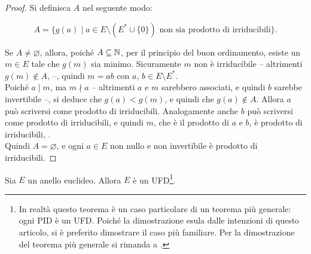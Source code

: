 \documentclass[a4paper]{article}
\let\emptyset\varnothing
\begin{document}
\begin{proof}
    Si definisca $A$ nel seguente modo:

    \[A = \{g(a) \mid a \in E \setminus (E^* \cup \{0\}) \text{ non sia prodotto di irriducibili}\}.\]

    \vskip 0.1in

    Se $A \neq \emptyset$, allora, poiché $A \subseteq \mathbb{N}$, per il principio
    del buon ordinamento, esiste un $m \in E$ tale che $g(m)$ sia minimo.
    Sicuramente $m$ non è irriducibile -- altrimenti $g(m) \notin A$, \Lightning{} --,
    quindi $m=ab$ con $a$, $b \in E \setminus E^*$. \\

    Poiché $a \mid m$, ma $m \nmid a$ -- altrimenti $a$ e $m$ sarebbero
    associati, e quindi $b$ sarebbe invertibile --, si deduce che $g(a) < g(m)$, e
    quindi che $g(a) \notin A$. Allora $a$ può scriversi come prodotto di irriducibili.
    Analogamente anche $b$ può scriversi come prodotto di irriducibili, e quindi
    $m$, che è il prodotto di $a$ e $b$, è prodotto di irriducibili, \Lightning{}. \\

    Quindi $A = \emptyset$, e ogni $a \in E$ non nullo e non invertibile è prodotto
    di irriducibili.
\end{proof}

\begin{theorem}
    \label{th:euclidei_ufd}
    Sia $E$ un anello euclideo. Allora $E$ è un UFD\footnote{In realtà questo teorema
        è un caso particolare di un teorema più generale: ogni PID è un UFD. Poiché
        la dimostrazione esula dalle intenzioni di questo articolo, si è preferito
        dimostrare il caso più familiare. Per la dimostrazione del teorema più generale si
        rimanda a \cite[pp.~124-126]{di2013algebra}.}.
\end{theorem}
\end{document}
